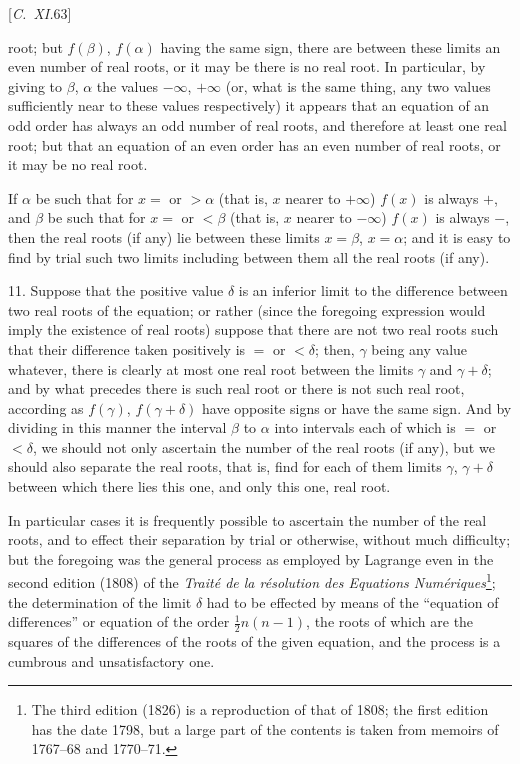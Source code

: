 \documentclass[12pt,a4paper,oneside]{book}
\newcommand{\paperref}[1]{\par\noindent\hfill[#1]\hfill\null\par}
\begin{document}
\paperref{\textit{C.~XI.}\hfill 63}
\newpage
root; but $f(\beta)$, $f(\alpha)$ having the same sign, there are between these limits an even number of real roots, or it may be there is no real root. In particular, by giving to $\beta$, $\alpha$ the values $-\infty$, $+\infty$ (or, what is the same thing, any two values sufficiently near to these values respectively) it appears that an equation of an odd order has always an odd number of real roots, and therefore at least one real root; but that an equation of an even order has an even number of real roots, or it may be no real root.

If $\alpha$ be such that for $x=$ or $>\alpha$ (that is, $x$ nearer to $+\infty$) $f(x)$ is always $+$, and $\beta$ be such that for $x=$ or $<\beta$ (that is, $x$ nearer to $-\infty$) $f(x)$ is always $-$, then the real roots (if any) lie between these limits $x=\beta$, $x=\alpha$; and it is easy to find by trial such two limits including between them all the real roots (if any).

11. Suppose that the positive value $\delta$ is an inferior limit to the difference between two real roots of the equation; or rather (since the foregoing expression would imply the existence of real roots) suppose that there are not two real roots such that their difference taken positively is $=$ or $<\delta$; then, $\gamma$ being any value whatever, there is clearly at most one real root between the limits $\gamma$ and $\gamma+\delta$; and by what precedes there is such real root or there is not such real root, according as $f(\gamma)$, $f(\gamma+\delta)$ have opposite signs or have the same sign. And by dividing in this manner the interval $\beta$ to $\alpha$ into intervals each of which is $=$ or $<\delta$, we should not only ascertain the number of the real roots (if any), but we should also separate the real roots, that is, find for each of them limits $\gamma$, $\gamma+\delta$ between which there lies this one, and only this one, real root.

In particular cases it is frequently possible to ascertain the number of the real roots, and to effect their separation by trial or otherwise, without much difficulty; but the foregoing was the general process as employed by Lagrange even in the second edition (1808) of the \textit{Trait\'e de la r\'esolution des Equations Num\'eriques}\footnote{The third edition (1826) is a reproduction of that of 1808; the first edition has the date 1798, but a large part of the contents is taken from memoirs of 1767--68 and 1770--71.}; the determination of the limit $\delta$ had to be effected by means of the ``equation of differences'' or equation of the order $\tfrac{1}{2}n(n-1)$, the roots of which are the squares of the differences of the roots of the given equation, and the process is a cumbrous and unsatisfactory one.
\end{document}
